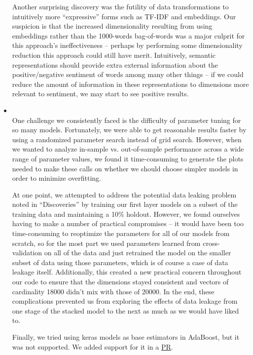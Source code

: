 \begin{itemize}
        Another surprising discovery was the futility of data transformations to intuitively more ``expressive'' forms such as TF-IDF and embeddings. Our suspicion is that the increased dimensionality resulting from using embeddings rather than the 1000-words bag-of-words was a major culprit for this approach's ineffectiveness -- perhaps by performing some dimensionality reduction this approach could still have merit. Intuitively, semantic representations should provide extra external information about the positive/negative sentiment of words among many other things -- if we could reduce the amount of information in these representations to dimensions more relevant to sentiment, we may start to see positive results.

    \item {} \\
        One challenge we consistently faced is the difficulty of parameter tuning for so many models. Fortunately, we were able to get reasonable results faster by using a randomized parameter search instead of grid search. However, when we wanted to analyze in-sample vs. out-of-sample performance across a wide range of parameter values, we found it time-consuming to generate the plots needed to make these calls on whether we should choose simpler models in order to minimize overfitting.

        At one point, we attempted to address the potential data leaking problem noted in ``Discoveries'' by training our first layer models on a subset of the training data and maintaining a 10\% holdout. However, we found ourselves having to make a number of practical compromises -- it would have been too time-consuming to reoptimize the parameters for all of our models from scratch, so for the most part we used parameters learned from cross-validation on all of the data and just retrained the model on the smaller subset of data using those parameters, which is of course a case of data leakage itself. Additionally, this created a new practical concern throughout our code to ensure that the dimensions stayed consistent and vectors of cardinality 18000 didn't mix with those of 20000. In the end, these complications prevented us from exploring the effects of data leakage from one stage of the stacked model to the next as much as we would have liked to.

        Finally, we tried using keras models as base estimators in AdaBoost, but it was not supported. We added support for it in a \href{https://github.com/keras-team/keras/pull/9252}{PR}.



\end{itemize}

